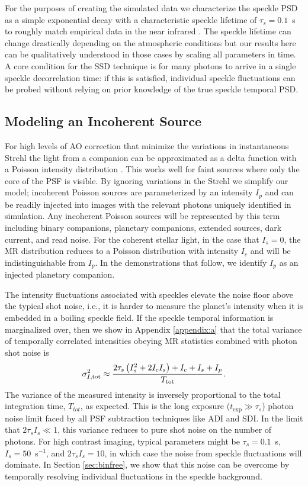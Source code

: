 \documentclass[../main.tex]{subfiles}
\begin{document}
For the purposes of creating the simulated data we characterize the speckle PSD as a simple exponential decay with a characteristic speckle lifetime of $\tau_s = 0.1$~s to roughly match empirical data in the near infrared \parencite{fitzgerald_2006, Meeker2018, Goebel_2018}. The speckle lifetime can change drastically depending on the atmospheric conditions but our results here can be qualitatively understood in those cases by scaling all parameters in time. A core condition for the SSD technique is for many photons to arrive in a single speckle decorrelation time: if this is satisfied, individual speckle fluctuations can be probed without relying on prior knowledge of the true speckle temporal PSD.

\subsection{Modeling an Incoherent Source}

For high levels of AO correction that minimize the variations in instantaneous Strehl the light from a companion can be approximated as a delta function with a Poisson intensity distribution \parencite{Gladysz_2008b}. This works well for faint sources where only the core of the PSF is visible. By ignoring variations in the Strehl we simplify our model; incoherent Poisson sources are parameterized by an intensity $I_p$ and can be readily injected into images with the relevant photons uniquely identified in simulation. Any incoherent Poisson sources will be represented by this term including binary companions, planetary companions, extended sources, dark current, and read noise. For the coherent stellar light, in the case that $I_s=0$, the MR distribution reduces to a Poisson distribution with intensity $I_c$ and will be indistinguishable from $I_p$. In the demonstrations that follow, we identify $I_p$ as an injected planetary companion. 

The intensity fluctuations associated with speckles elevate the noise floor above the typical shot noise, i.e., it is harder to measure the planet's intensity when it is embedded in a boiling speckle field. If the speckle temporal information is marginalized over, then we show in Appendix \ref{appendix:a} that the total variance of temporally correlated intensities obeying MR statistics combined with photon shot noise is 
\begin{equation}
    \sigma^2_{I, \rm tot} \approx \frac{2\tau_s \left( I_s^2 + 2 I_c I_s \right) + I_c + I_s + I_p}{T_{\rm tot}}.
    \label{eq:totalnoise}
\end{equation}
The variance of the measured intensity is inversely proportional to the total integration time, $T_{tot}$, as expected. This is the long exposure ($t_\mathrm{exp} \gg \tau_s$) photon noise limit faced by all PSF subtraction techniques like ADI and SDI. In the limit that $2\tau_s I_s \ll 1$, this variance reduces to pure shot noise on the number of photons. For high contrast imaging, typical parameters might be $\tau_s=0.1$~s, $I_s=50$~s$^{-1}$, and $2\tau_s I_s = 10$, in which case the noise from speckle fluctuations will dominate. In Section \ref{sec:binfree}, we show that this noise can be overcome by temporally resolving individual fluctuations in the speckle background. 
\end{document}
